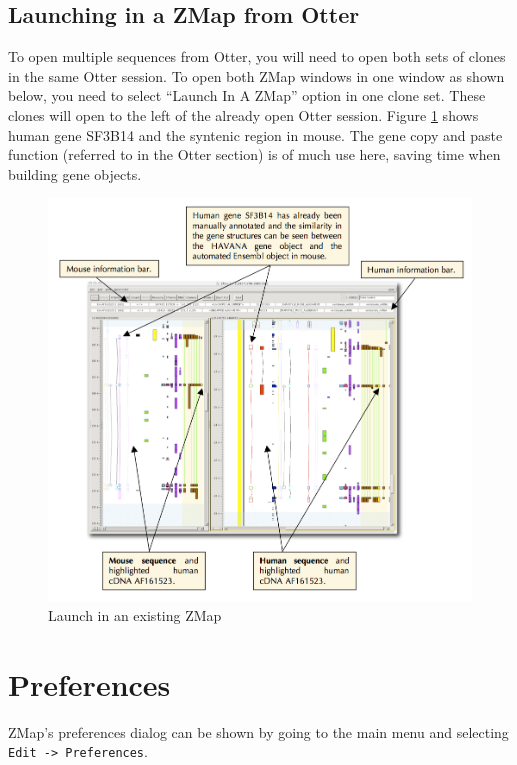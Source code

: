 \documentclass[letterpaper]{article}
\newcounter{Figure}
\begin{document}
\subsection{Launching in a ZMap from Otter}
To open multiple sequences from Otter, you will need to open both sets of clones in the same Otter session. To open both ZMap windows in one window as shown below, you need to select ``Launch In A ZMap'' option in one clone set. These clones will open to the left of the already open Otter session. Figure \ref{img_launch_in_zmap} shows human gene SF3B14 and the syntenic region in mouse. The gene copy and paste function (referred to in the Otter section) is of much use here, saving time when building gene objects.

\begin{figure}
\centering
\color[rgb]{0.30980393,0.5058824,0.7411765}
\includegraphics[width=15.231cm]{images/launch_in_zmap.png}
\caption{Launch in an existing ZMap}
\label{img_launch_in_zmap}
\end{figure}


\clearpage
\section{Preferences} \label{sec_preferences}
ZMap's preferences dialog can be shown by going to the main menu and selecting \lstinline{Edit -> Preferences}.
\end{document}
